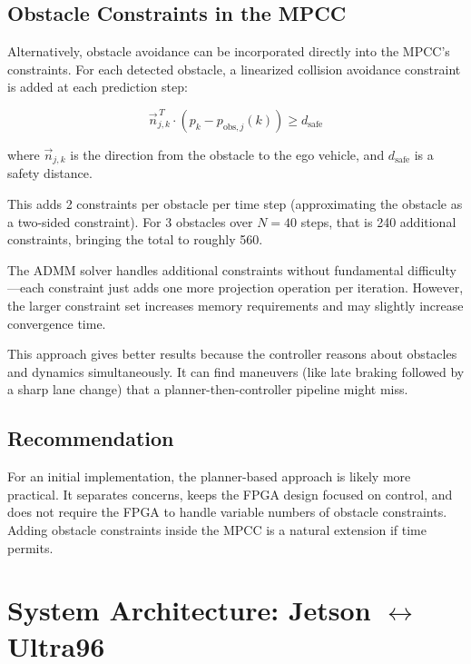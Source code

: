 \documentclass[12pt,a4paper]{article}
\begin{document}
\subsection{Obstacle Constraints in the MPCC}

Alternatively, obstacle avoidance can be incorporated directly into the MPCC's constraints. For each detected obstacle, a linearized collision avoidance constraint is added at each prediction step:

\[
    \vec{n}_{j,k}^{\,T} \cdot (p_k - p_{\text{obs},j}(k)) \geq d_{\text{safe}}
\]

where $\vec{n}_{j,k}$ is the direction from the obstacle to the ego vehicle, and $d_{\text{safe}}$ is a safety distance.

This adds 2 constraints per obstacle per time step (approximating the obstacle as a two-sided constraint). For 3 obstacles over $N=40$ steps, that is 240 additional constraints, bringing the total to roughly 560.

The ADMM solver handles additional constraints without fundamental difficulty---each constraint just adds one more projection operation per iteration. However, the larger constraint set increases memory requirements and may slightly increase convergence time.

This approach gives better results because the controller reasons about obstacles and dynamics simultaneously. It can find maneuvers (like late braking followed by a sharp lane change) that a planner-then-controller pipeline might miss.

\subsection{Recommendation}

For an initial implementation, the planner-based approach is likely more practical. It separates concerns, keeps the FPGA design focused on control, and does not require the FPGA to handle variable numbers of obstacle constraints. Adding obstacle constraints inside the MPCC is a natural extension if time permits.

\section{System Architecture: Jetson $\leftrightarrow$ Ultra96}
\end{document}

